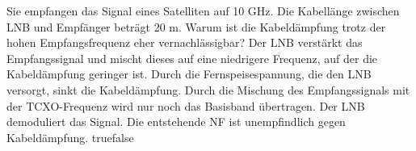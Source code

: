     {Sie empfangen das Signal eines Satelliten auf 10 GHz. Die Kabellänge zwischen LNB und Empfänger beträgt 20 m. Warum ist die Kabeldämpfung trotz der hohen Empfangsfrequenz eher vernachlässigbar? }
    {Der LNB verstärkt das Empfangssignal und mischt dieses auf eine niedrigere Frequenz, auf der die Kabeldämpfung geringer ist. }
    {Durch die Fernspeisespannung, die den LNB versorgt, sinkt die Kabeldämpfung.}
    {Durch die Mischung des Empfangssignals mit der TCXO-Frequenz wird nur noch das Basisband übertragen. }
    {Der LNB demoduliert das Signal. Die entstehende NF ist unempfindlich gegen Kabeldämpfung.}
    {true}{false}